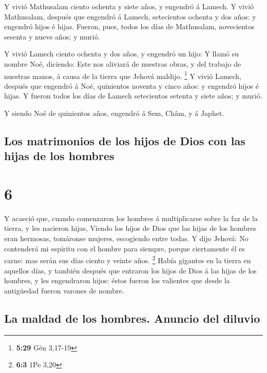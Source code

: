  Y vivió Mathusalam ciento ochenta y siete años, y
engendró á Lamech.  Y vivió Mathusalam, después que
engendró á Lamech, setecientos ochenta y dos años: y engendró hijos é
hijas.  Fueron, pues, todos los días de Mathusalam,
novecientos sesenta y nueve años; y murió.

 Y vivió Lamech ciento ochenta y dos años, y engendró un
hijo:  Y llamó su nombre Noé, diciendo: Este nos aliviará
de nuestras obras, y del trabajo de nuestras manos, á causa de la tierra
que Jehová maldijo. \footnote{\textbf{5:29} Gén 3,17-19} 
Y vivió Lamech, después que engendró á Noé, quinientos noventa y cinco
años: y engendró hijos é hijas.  Y fueron todos los días
de Lamech setecientos setenta y siete años; y murió.

 Y siendo Noé de quinientos años, engendró á Sem, Châm, y
á Japhet.

\hypertarget{los-matrimonios-de-los-hijos-de-dios-con-las-hijas-de-los-hombres}{%
\subsection{Los matrimonios de los hijos de Dios con las hijas de los
hombres}\label{los-matrimonios-de-los-hijos-de-dios-con-las-hijas-de-los-hombres}}

\hypertarget{section-5}{%
\section{6}\label{section-5}}

 Y acaeció que, cuando comenzaron los hombres á
multiplicarse sobre la faz de la tierra, y les nacieron hijas,
 Viendo los hijos de Dios que las hijas de los hombres
eran hermosas, tomáronse mujeres, escogiendo entre todas. 
Y dijo Jehová: No contenderá mi espíritu con el hombre para siempre,
porque ciertamente él es carne: mas serán sus días ciento y veinte años.
\footnote{\textbf{6:3} 1Pe 3,20}  Había gigantes en la
tierra en aquellos días, y también después que entraron los hijos de
Dios á las hijas de los hombres, y les engendraron hijos: éstos fueron
los valientes que desde la antigüedad fueron varones de nombre.

\hypertarget{la-maldad-de-los-hombres.-anuncio-del-diluvio}{%
\subsection{La maldad de los hombres. Anuncio del
diluvio}\label{la-maldad-de-los-hombres.-anuncio-del-diluvio}}

